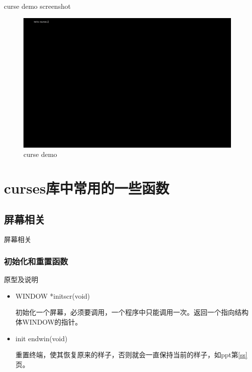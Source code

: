 \documentclass{beamer}
\begin{document}
\begin{frame}{curse demo screenshot}
\label{ss}
\begin{figure}
\includegraphics[width=1\textwidth]{801.png}
\caption{curse demo}
\label{demo}
\end{figure}
\end{frame}
\section{curses库中常用的一些函数}
\subsection{屏幕相关}
\begin{frame}
\Huge{\centerline{屏幕相关}}
\end{frame}
\begin{frame}
\frametitle{初始化和重置函数}
\begin{block}{原型及说明}
\begin{itemize}
\item
WINDOW *initscr(void)

初始化一个屏幕，必须要调用，一个程序中只能调用一次。返回一个指向结构体WINDOW的指针。
\item
init endwin(void)

重置终端，使其恢复原来的样子，否则就会一直保持当前的样子，如ppt第\ref{ss}页。
\end{itemize}
\end{block}

\end{frame}
\end{document}

